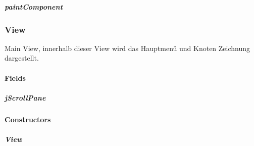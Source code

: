 \documentclass[letterpaper,10pt,ngerman]{sphinxmanual}
\begin{document}
\subparagraph{paintComponent}
\label{\detokenize{com/linuxluigi/edu/view/NodePanel:paintcomponent}}

\begin{fulllineitems}
\label{\detokenize{com/linuxluigi/edu/view/NodePanel:com.linuxluigi.edu.view.NodePanel.paintComponent(Graphics)}}
\end{fulllineitems}



\subsubsection{View}
\label{\detokenize{com/linuxluigi/edu/view/View::doc}}\label{\detokenize{com/linuxluigi/edu/view/View:view}}

\begin{fulllineitems}
\label{\detokenize{com/linuxluigi/edu/view/View:com.linuxluigi.edu.view.View}}
Main View, innerhalb dieser View wird das Hauptmenü und Knoten Zeichnung dargestellt.

\end{fulllineitems}



\paragraph{Fields}
\label{\detokenize{com/linuxluigi/edu/view/View:fields}}

\subparagraph{jScrollPane}
\label{\detokenize{com/linuxluigi/edu/view/View:jscrollpane}}

\begin{fulllineitems}
\label{\detokenize{com/linuxluigi/edu/view/View:com.linuxluigi.edu.view.View.jScrollPane}}
\end{fulllineitems}



\paragraph{Constructors}
\label{\detokenize{com/linuxluigi/edu/view/View:constructors}}

\subparagraph{View}
\label{\detokenize{com/linuxluigi/edu/view/View:id1}}
\end{document}
